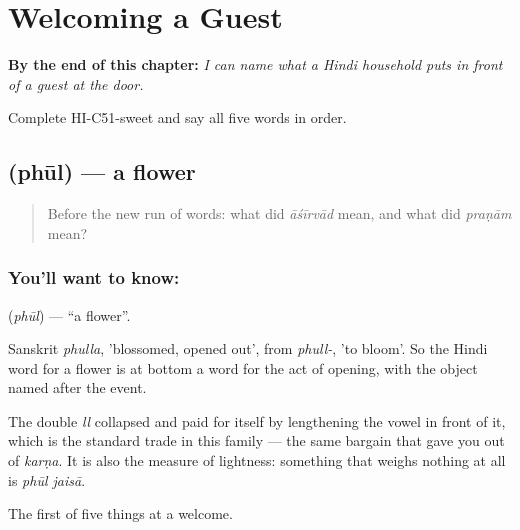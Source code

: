 
\chapter{Welcoming a Guest}
\label{ch:hi-welcoming-a-guest}

\begin{chapteropening}
\textbf{By the end of this chapter:} \emph{I can name what a Hindi household puts in front of a guest at the door.}

Complete HI-C51-sweet and say all five words in order.
\end{chapteropening}

\section[\texorpdfstring{\hi{फूल} (phūl)}{फूल (phūl)}]{ (phūl) — a flower}

\label{lesson:HI-C51-flower}



\begin{quote}
Before the new run of words: what did \emph{āśīrvād} mean, and what did \emph{praṇām} mean?
\end{quote}

\subsection*{You'll want to know: }
\textbf{} (\emph{phūl}) — \textquotedblleft{}a flower\textquotedblright{}.

Sanskrit \emph{phulla}, 'blossomed, opened out', from \emph{phull-}, 'to bloom'. So the Hindi word for a flower is at bottom a word for the act of opening, with the object named after the event.

The double \emph{ll} collapsed and paid for itself by lengthening the vowel in front of it, which is the standard trade in this family — the same bargain that gave you  out of \emph{karṇa}. It is also the measure of lightness: something that weighs nothing at all is \emph{phūl jaisā}.

\begin{grammarlens}[title={What you've built}]
The first of five things at a welcome.
\end{grammarlens}

